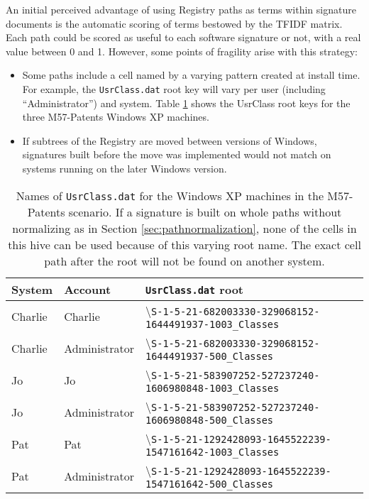 \documentclass[11pt]{ucthesis}
\theoremstyle{plain}
\theoremstyle{definition}
\newcommand{\breakingbackslash}{\textbackslash\allowbreak{}}
\begin{document}
An initial perceived advantage of using Registry paths as terms within signature documents is the automatic scoring of terms bestowed by the TFIDF matrix.  Each path could be scored as useful to each software signature or not, with a real value between 0 and 1.  However, some points of fragility arise with this strategy:

\begin{itemize}
\item Some paths include a cell named by a varying pattern created at install time.  For example, the \texttt{UsrClass.dat} root key will vary per user (including ``Administrator'') and system.  Table \ref{tbl:m57usrclassroots} shows the UsrClass root keys for the three M57-Patents Windows XP machines.
\item If subtrees of the Registry are moved between versions of Windows, signatures built before the move was implemented would not match on systems running on the later Windows version.
\end{itemize}

\begin{table}[htp]
\caption{Names of \texttt{UsrClass.dat} for the Windows XP machines in the M57-Patents scenario.  If a signature is built on whole paths without normalizing as in Section \ref{sec:pathnormalization}, none of the cells in this hive can be used because of this varying root name.  The exact cell path after the root will not be found on another system.}
\begin{center}
\begin{small}
\begin{tabular}{lll}
\toprule
System & Account & \texttt{UsrClass.dat} root \\
\midrule
Charlie & Charlie & {\breakingbackslash}\texttt{S-1-5-21-682003330-329068152-1644491937-1003\_Classes} \\
Charlie & Administrator & {\breakingbackslash}\texttt{S-1-5-21-682003330-329068152-1644491937-500\_Classes} \\
Jo & Jo & {\breakingbackslash}\texttt{S-1-5-21-583907252-527237240-1606980848-1003\_Classes} \\
Jo & Administrator & {\breakingbackslash}\texttt{S-1-5-21-583907252-527237240-1606980848-500\_Classes} \\
Pat & Pat & {\breakingbackslash}\texttt{S-1-5-21-1292428093-1645522239-1547161642-1003\_Classes} \\
Pat & Administrator & {\breakingbackslash}\texttt{S-1-5-21-1292428093-1645522239-1547161642-500\_Classes} \\
\bottomrule
\end{tabular}
\end{small}
\end{center}
\label{tbl:m57usrclassroots}
\end{table}
\end{document}
